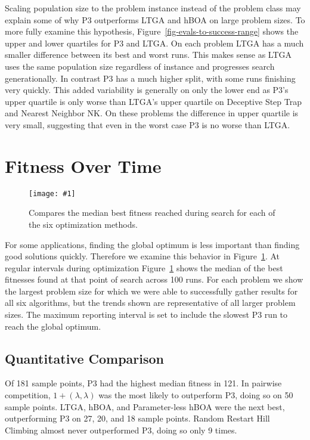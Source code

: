 \documentclass[twoside]{article}
\newcommand{\includegraphicsfit}[1]
{\texttt{[image: \#1]}}
\begin{document}
Scaling population size to the problem instance instead of the problem class may explain some of why P3 outperforms
LTGA and hBOA on large problem sizes.
To more fully examine this hypothesis,
Figure~\ref{fig-evals-to-success-range} shows the upper and lower quartiles for P3 and LTGA. On each problem
LTGA has a much smaller difference between its best and worst runs. This makes sense as LTGA uses the same
population size regardless of instance and progresses search generationally. In contrast P3 has a much
higher split, with some runs finishing very quickly. This added variability is generally on only the lower
end as P3's upper quartile is only worse than LTGA's upper quartile on Deceptive Step Trap and Nearest
Neighbor NK. On these problems the difference in upper quartile is very small, suggesting that even in the worst
case P3 is no worse than LTGA.

\section{Fitness Over Time}
\label{sec-overtime}
\begin{figure}
  \begin{center}
  \includegraphicsfit{fitness-over-time}
  \end{center}
  \caption{Compares the median best fitness reached during search for each of the six optimization methods.}
  \label{fig-fitness-over-time}
\end{figure}

For some applications, finding the global optimum is less important than finding good solutions quickly. Therefore
we examine this behavior in Figure~\ref{fig-fitness-over-time}. At regular intervals during optimization
Figure~\ref{fig-fitness-over-time} shows the median of the best fitnesses found at that point of search across
100 runs. For each problem we show the largest problem size for which we were able to successfully gather results
for all six algorithms, but the trends shown are representative of all larger problem sizes. The maximum reporting interval
is set to include the slowest P3 run to reach the global optimum.


\subsection{Quantitative Comparison}
Of 181 sample points, P3 had the highest median fitness in 121. In pairwise competition, $1+(\lambda, \lambda)$
was the most likely to outperform P3, doing so on 50 sample points. LTGA, hBOA, and Parameter-less hBOA
were the next best, outperforming P3 on 27, 20, and 18 sample points. Random Restart Hill Climbing almost
never outperformed P3, doing so only 9 times.
\end{document}
